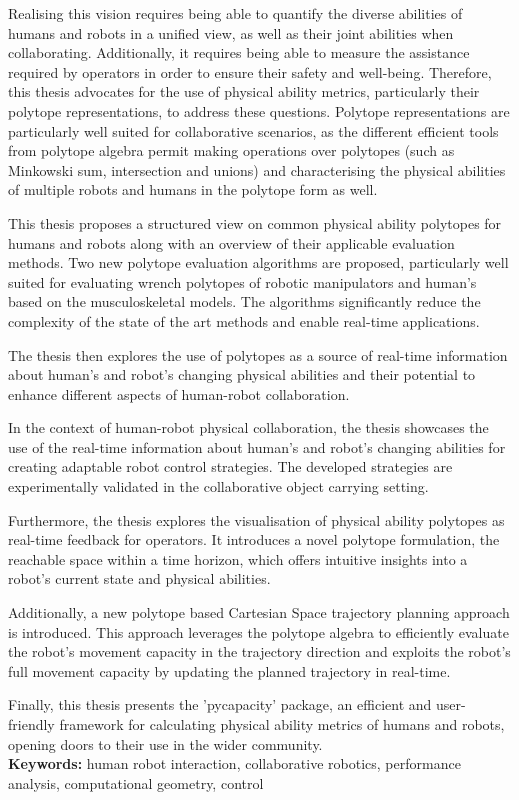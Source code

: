 \documentclass[french,12pt,a4paper]{report}
\begin{document}
\begin{small}
Realising this vision requires being able to quantify the diverse abilities of humans and robots in a unified view, as well as their joint abilities when collaborating. Additionally, it requires being able to measure the assistance required by operators in order to ensure their safety and well-being. Therefore, this thesis advocates for the use of physical ability metrics, particularly their polytope representations, to address these questions. Polytope representations are particularly well suited for collaborative scenarios, as the different efficient tools from polytope algebra permit making operations over polytopes (such as Minkowski sum, intersection and unions) and characterising the physical abilities of multiple robots and humans in the polytope form as well. 

This thesis proposes a structured view on common physical ability polytopes for humans and robots along with an overview of their applicable evaluation methods. Two new polytope evaluation algorithms are proposed, particularly well suited for evaluating wrench polytopes of robotic manipulators and human's based on the musculoskeletal models. The algorithms significantly reduce the complexity of the state of the art methods and enable real-time applications. 

The thesis then explores the use of polytopes as a source of real-time information about human's and robot's changing physical abilities and their potential to enhance different aspects of human-robot collaboration.

In the context of human-robot physical collaboration, the thesis showcases the use of the real-time information about human's and robot's changing abilities for creating adaptable robot control strategies. The developed strategies are experimentally validated in the collaborative object carrying setting. 

Furthermore, the thesis explores the visualisation of physical ability polytopes as real-time feedback for operators. It introduces a novel polytope formulation, the reachable space within a time horizon, which offers intuitive insights into a robot's current state and physical abilities. 

Additionally, a new polytope based Cartesian Space trajectory planning approach is introduced. This approach leverages the polytope algebra to efficiently evaluate the robot's movement capacity in the trajectory direction and exploits the robot's full movement capacity by updating the planned trajectory in real-time. 

Finally, this thesis presents the 'pycapacity' package, an efficient and user-friendly framework for calculating physical ability metrics of humans and robots, opening doors to their use in the wider community.\\
\noindent\makebox[\linewidth]{\rule{\textwidth}{0.4pt}}
\textbf{Keywords:} human robot interaction, collaborative robotics, performance analysis, computational geometry, control \\

\end{small}
\vfill
\end{document}
